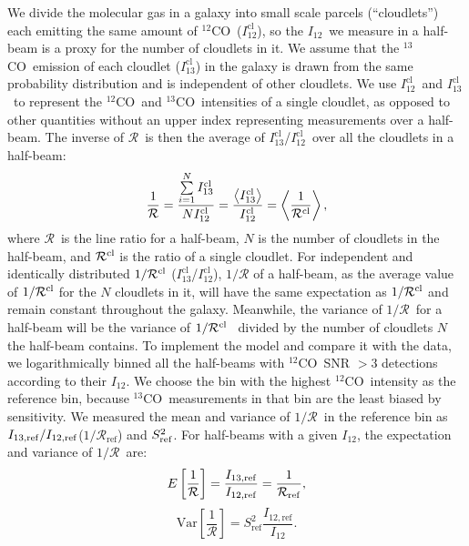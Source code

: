 \documentclass{emulateapj}
\def\beq{\begin{equation}}
\def\eeq{\end{equation}}
\def\ttco{\mbox{$^{13}$CO}}
\def\twco{\mbox{$^{12}$CO}}
\def\rtt{$\mathcal{R}$}
\def\itw{$I_{12}$}
\def\itwc{$I_{12}^{\mathrm{cl}}$}
\def\ittc{$I_{13}^{\mathrm{cl}}$}
\begin{document}
We divide the molecular gas in a galaxy into small scale parcels
(``cloudlets'') each emitting the same amount of \twco \ (\itwc), 
so the \itw \ we measure in a half-beam is a proxy for the
number of cloudlets in it. 
We assume that the \ttco \ emission of each cloudlet (\ittc) in the galaxy 
is drawn from the same probability distribution and is 
independent of other cloudlets. 
We use \itwc \ and \ittc \ 
to represent the \twco \ and \ttco \ intensities of a single cloudlet,
as opposed to other quantities without an upper index 
representing measurements over a half-beam.  
The inverse of \rtt \ is then the average of
\ittc/\itwc \  
over all the cloudlets in a half-beam:
\beq
\frac{1}{\mathcal{R}} = 
\frac{\sum\limits_{i=1}^{N} I_{13}^{\rm cl}}{N I_{12}^{\rm cl}} 
= \frac{\left<I_{13}^{\rm cl}\right>}{I_{12}^{\rm cl}}
= \left<\frac{1}{\mathcal{R}^{\rm cl}}\right> ,
\eeq
where \rtt \ is the line ratio for a half-beam, $N$ is the number of cloudlets in the half-beam, and $\mathcal{R}^{\rm cl}$ is the ratio of a single cloudlet.
For independent and identically distributed $1/\mathcal{R}^{\rm cl}$ 
(\ittc/\itwc), $1/\mathcal{R}$ of a half-beam, as the average value of $1/\mathcal{R}^{\rm cl}$ for the $N$ cloudlets in it, will have 
the same expectation as $1/\mathcal{R}^{\rm cl}$ and  remain constant throughout the galaxy. 
Meanwhile, the variance of $1/$\rtt \ for a half-beam will be 
the variance of $1/\mathcal{R}^{\rm cl}$ \ divided by the number of cloudlets $N$ the half-beam contains. 
To implement the model and compare it with the data,
we logarithmically binned all the half-beams with \twco \ 
SNR $> 3$ detections according to their \itw. 
We choose the bin with the highest \twco \ intensity as the reference 
bin, because \ttco \ measurements in that bin are the least 
biased by sensitivity.    
We measured the mean and variance of $1/$\rtt \ in the reference bin 
as $I_{13,\mathrm{ref}}/I_{12,\rm ref}$($1/$\rtt$_{\mathrm{ref}}$) and $S_{\rm ref}^2$. 
For half-beams with a given \itw, the expectation and variance 
of $1/$\rtt \ are:  
\beq
E\left[\frac{1}{\mathcal{R}}\right]  = \frac{I_{13,\mathrm{ref}}}{I_{12,\rm ref}} = \frac{1}{\mathcal{R}_{\mathrm{ref}}},
\eeq
\beq
 \mathrm{Var}\left[\frac{1}{\mathcal{R}}\right]= S_{\mathrm{ref}}^2 \frac{I_{\mathrm{12, ref}}}{I_{12}}.
\eeq
\end{document}
